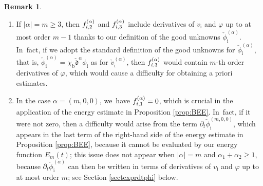 \documentclass[11pt]{article}
\newcommand{\skpt}{\smallskip}
\newenvironment{enumeratei}
{\bgroup\def\theenumi{\roman{enumi}}\def\theenumii{\arabic{enumii}}\begin{enumerate}}
{\end{enumerate}\egroup}
\newcommand{\dt}{\partial_t}
\newcommand{\cmfalpha}{\check{\mathfrak{d}}^{\alpha}}
\theoremstyle{definition}
\newtheorem{remark}[theorem]{Remark}
\begin{document}
\skpt
\begin{remark}\label{re:GU2}
\begin{enumeratei}
\item\label{re:GU2i}
If $|\alpha|=m\geq3$, then $f_{{\rm i},2}^{(\alpha)}$ and $f_{{\rm i},3}^{(\alpha)}$ include derivatives of $v_\mathrm{i}$ and $\varphi$ up to at most order $m-1$
thanks to our definition of the good unknowns $\check{\phi}_\mathrm{i}^{(\alpha)}$. In~fact, if we adopt the standard definition of the good unknowns for
$\check{\phi}_\mathrm{i}^{(\alpha)}$, that is, $\check{\phi}_\mathrm{i}^{(\alpha)}=\chi_\mathrm{b}\cmfalpha\phi_\mathrm{i}$ as for $\check{v}_\mathrm{i}^{(\alpha)}$,
then $f_{{\rm i},3}^{(\alpha)}$ would contain $m$-th order derivatives of $\varphi$, which would cause a difficulty for obtaining a priori estimates.

\item\label{re:GU2ii}
In the case $\alpha=(m,0,0)$, we~have $f_{{\rm i},1}^{(\alpha)}=0$, which is crucial in the application of the energy estimate in Proposition \ref{prop:BEE}. In~fact, if it were not zero, then a difficulty would arise from the term $\dt\check{\phi}_\mathrm{i}^{(m,0,0)}$,
which appears in the last term of the right-hand side of the energy estimate in Proposition \ref{prop:BEE},
because it cannot be evaluated by our energy function $E_m(t)$;
this issue does not appear when $|\alpha|=m$ and $\alpha_1+\alpha_2\geq1$,
because $\dt\check{\phi}_\mathrm{i}^{(\alpha)}$ can then be written in terms of derivatives of $v_\mathrm{i}$ and $\varphi$ up to at most order $m$;
see Section \ref{sectexprdtphi} below.
\end{enumeratei}
\end{remark}
\end{document}
